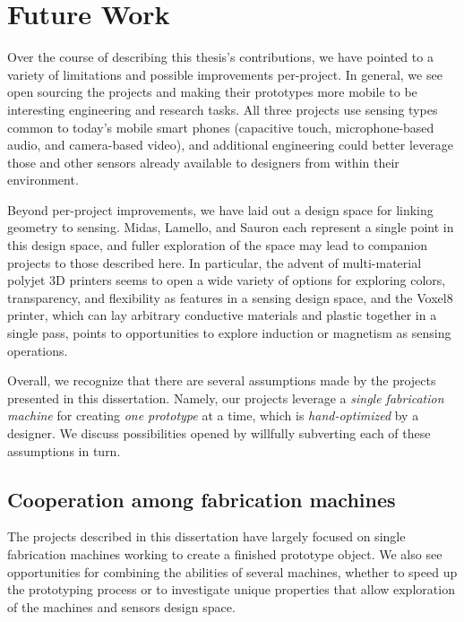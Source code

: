 \section{Future Work}

Over the course of describing this thesis's contributions, we have pointed to a variety of limitations and possible improvements per-project. In general, we see open sourcing the projects and making their prototypes more mobile to be interesting engineering and research tasks. All three projects use sensing types common to today's mobile smart phones (capacitive touch, microphone-based audio, and camera-based video), and additional engineering could better leverage those and other sensors already available to designers from within their environment.

Beyond per-project improvements, we have laid out a design space for linking geometry to sensing. Midas, Lamello, and Sauron each represent a single point in this design space, and fuller exploration of the space may lead to companion projects to those described here. In particular, the advent of multi-material polyjet 3D printers seems to open a wide variety of options for exploring colors, transparency, and flexibility as features in a sensing design space, and the Voxel8 \cite{voxel8} printer, which can lay arbitrary conductive materials and plastic together in a single pass, points to opportunities to explore induction or magnetism as sensing operations.

Overall, we recognize that there are several assumptions made by the projects presented in this dissertation. Namely, our projects leverage a \emph{single fabrication machine}  for creating \emph{one prototype} at a time, which is \emph{hand-optimized} by a designer. We discuss possibilities opened by willfully subverting each of these assumptions in turn.

\subsection{Cooperation among fabrication machines}

The projects described in this dissertation have largely focused on single fabrication machines working to create a finished prototype object. We also see opportunities for combining the abilities of several machines, whether to speed up the prototyping process or to investigate unique properties that allow exploration of the machines and sensors design space.

